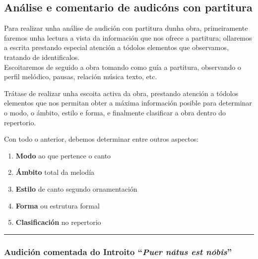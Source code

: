 \documentclass[a4paper, twoside]{templates/ociamthesis}
\providecommand{\tightlist}{%
  \setlength{\itemsep}{0pt}\setlength{\parskip}{0pt}}
\begin{document}
\hypertarget{anuxe1lise-e-comentario-de-audicuxf3ns-con-partitura}{%
\subsection*{Análise e comentario de audicóns con partitura}\label{anuxe1lise-e-comentario-de-audicuxf3ns-con-partitura}}

Para realizar unha análise de audición con partitura dunha obra, primeiramente faremos unha lectura a vista da información que nos ofrece a partitura; ollaremos a escrita prestando especial atención a tódolos elementos que observamos, tratando de identificalos.\\
Escoitaremos de seguido a obra tomando como guía a partitura, observando o perfil melódico, pausas, relación música texto, etc.

Trátase de realizar unha escoita activa da obra, prestando atención a tódolos elementos que nos permitan obter a máxima información posible para determinar o modo, o ámbito, estilo e forma, e finalmente clasificar a obra dentro do repertorio.

Con todo o anterior, debemos determinar entre outros aspectos:

\begin{enumerate}
\def\labelenumi{\arabic{enumi}.}
\tightlist
\item
  \textbf{Modo} ao que pertence o canto
\item
  \textbf{Ámbito} total da melodía
\item
  \textbf{Estilo} de canto segundo ornamentación
\item
  \textbf{Forma} ou estrutura formal
\item
  \textbf{Clasificación} no repertorio
\end{enumerate}

\begin{center}\rule{0.5\linewidth}{0.5pt}\end{center}

\newpage

\hypertarget{audiciuxf3n-comentada-do-introito-puer-nuxe1tus-est-nuxf3bis}{%
\subsubsection*{\texorpdfstring{Audición comentada do Introito ``\emph{Puer nátus est nóbis}''}{Audición comentada do Introito ``Puer nátus est nóbis''}}\label{audiciuxf3n-comentada-do-introito-puer-nuxe1tus-est-nuxf3bis}}
\end{document}
